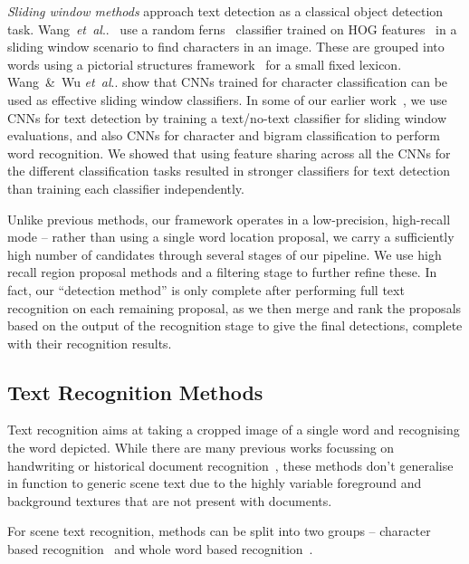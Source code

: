 \documentclass[twocolumn]{svjour3}          \smartqed  \usepackage{epsfig}
\makeatletter
\DeclareRobustCommand\onedot{\futurelet\@let@token\@onedot}
\def\@onedot{\ifx\@let@token.\else.\null\fi\xspace}
\def\etal{\emph{et~al}\onedot}
\makeatother
\begin{document}
\emph{Sliding window methods} approach text detection as a classical object detection task. Wang~\etal~\cite{Wang11} use a random ferns~\cite{Ozuysal07} classifier trained on HOG features~\cite{Felzenszwalb10a} in a sliding window scenario to find characters in an image. These are grouped into words using a pictorial structures framework~\cite{Felzenszwalb05} for a small fixed lexicon. Wang~\&~Wu \etal \cite{Wang12} show that CNNs trained for character classification can be used as effective sliding window classifiers. In some of our earlier work~\cite{Jaderberg14a}, we use CNNs for text detection by training a text/no-text classifier for sliding window evaluations, and also CNNs for character and bigram classification to perform word recognition. We showed that using feature sharing across all the CNNs for the different classification tasks resulted in stronger classifiers for text detection than training each classifier independently.

Unlike previous methods, our framework operates in a low-precision, high-recall mode -- rather than using a single word location proposal, we carry a sufficiently high number of candidates through several stages of our pipeline. We use high recall region proposal methods and a filtering stage to further refine these. In fact, our ``detection method'' is only complete after performing full text recognition on each remaining proposal, as we then merge and rank the proposals based on the output of the recognition stage to give the final detections, complete with their recognition results.

\subsection{Text Recognition Methods}
Text recognition aims at taking a cropped image of a single word and recognising the word depicted. While there are many previous works focussing on handwriting or historical document recognition~\cite{Fischer10,Rath07,Frinken12,Manmatha96}, these methods don't generalise in function to generic scene text due to the highly variable foreground and background textures that are not present with documents. 

For scene text recognition, methods can be split into two groups -- character based recognition~\cite{Yao14,Jaderberg14a,Bissacco13,Alsharif13,Wang11,Wang12,QuackText09,Posner10,Weinman13} and whole word based recognition~\cite{Goel13,Rodriguez13,Novikova12,Mishra12,Almazan14,Jaderberg14c}. 
\end{document}
